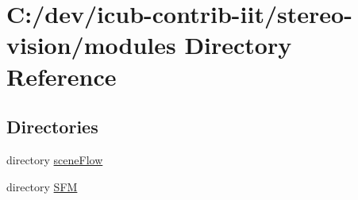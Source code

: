 \section{C\+:/dev/icub-\/contrib-\/iit/stereo-\/vision/modules Directory Reference}
\label{dir_e05d7e2b1ecd646af5bb94391405f3b5}
\subsection*{Directories}
\begin{DoxyCompactItemize}
\item 
directory \hyperlink{dir_abac25be6e9586a73e0319a6df944064}{scene\+Flow}
\item 
directory \hyperlink{dir_dde556652f18110d5b294adf514896ce}{S\+F\+M}
\end{DoxyCompactItemize}
